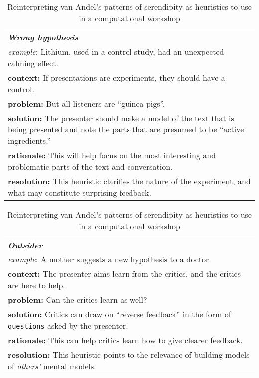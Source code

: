 \begin{table}[p]
\begin{tabular}{p{}}
{\bf\emph{Wrong hypothesis}}  \\[.1cm]
\emph{example}:  Lithium, used in a control study, had an unexpected calming effect. \\[.1cm]
{\bf context:} If presentations are experiments, they should have a control. \\
{\bf problem:} But all listeners are ``guinea pigs''.\\
{\bf solution:} The presenter should make a model of the text that is being presented and note the parts that are presumed to be ``active ingredients.'' \\
{\bf rationale:} This will help focus on the most interesting and problematic parts of the text and conversation.\\
{\bf resolution:} This heuristic clarifies the nature of the experiment, and what may constitute surprising feedback. \\
\end{tabular}
\medskip

\begin{tabular}{p{}}
{\bf\emph{Outsider}}  \\[.1cm]
\emph{example}:  A mother suggests a new hypothesis to a doctor. \\[.1cm]
{\bf context:} The presenter aims learn from the critics, and the critics are here to help. \\
{\bf problem:} Can the critics learn as well?\\
{\bf solution:} Critics can draw on ``reverse feedback'' in the form of {\tt questions} asked by the presenter.\\
{\bf rationale:} This can help critics learn how to give clearer feedback.\\
{\bf resolution:} This heuristic points to the relevance of building models of \emph{others'} mental models.\\
\end{tabular}
\vspace{.1cm}
\caption{Reinterpreting van Andel's patterns of serendipity as heuristics to use in a computational workshop\label{tab:reinterpret}}
\end{table}

\bigskip

